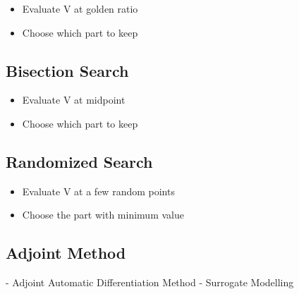\documentclass[12pt, letterpaper]{article}
\begin{document}
\begin{itemize}
\item Evaluate V at golden ratio
\item Choose which part to keep
\end{itemize}

\subsection{Bisection Search}
\label{sec:bisection-search}

\begin{itemize}
\item Evaluate V at midpoint
\item Choose which part to keep
\end{itemize}

\subsection{Randomized Search}
\label{sec:randomized-search}

\begin{itemize}
\item Evaluate V at a few random points
\item Choose the part with minimum value
\end{itemize}

\subsection{Adjoint Method}
\label{sec:adjoint-method}

- Adjoint Automatic Differentiation Method
- Surrogate Modelling
\end{document}

